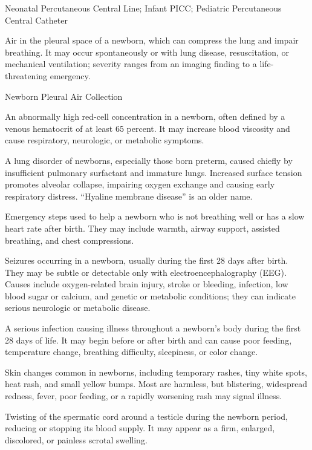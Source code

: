 \synonyms
Neonatal Percutaneous Central Line; Infant PICC; Pediatric Percutaneous Central Catheter

 Air in the pleural space of a newborn, which can compress the lung and impair breathing. It may occur spontaneously or with lung disease, resuscitation, or mechanical ventilation; severity ranges from an imaging finding to a life-threatening emergency.

\synonyms
Newborn Pleural Air Collection

 An abnormally high red-cell concentration in a newborn, often defined by a venous hematocrit of at least 65 percent. It may increase blood viscosity and cause respiratory, neurologic, or metabolic symptoms.

 A lung disorder of newborns, especially
those born preterm, caused chiefly by insufficient pulmonary surfactant and immature
lungs. Increased surface tension promotes alveolar collapse, impairing oxygen exchange
and causing early respiratory distress. “Hyaline membrane disease” is an older name.

 Emergency steps used to help a newborn who is not breathing well or has a slow heart rate after birth. They may include warmth, airway support, assisted breathing, and chest compressions.

 Seizures occurring in a newborn, usually during the first 28 days after birth. They may be subtle or detectable only with electroencephalography (EEG). Causes include oxygen-related brain injury, stroke or bleeding, infection, low blood sugar or calcium, and genetic or metabolic conditions; they can indicate serious neurologic or metabolic disease.

 A serious infection causing illness throughout a newborn's body during the first 28 days of life. It may begin before or after birth and can cause poor feeding, temperature change, breathing difficulty, sleepiness, or color change.

 Skin changes common in newborns, including temporary rashes, tiny white spots, heat rash, and small yellow bumps. Most are harmless, but blistering, widespread redness, fever, poor feeding, or a rapidly worsening rash may signal illness.

 Twisting of the spermatic cord around a testicle during the newborn period, reducing or stopping its blood supply. It may appear as a firm, enlarged, discolored, or painless scrotal swelling.

